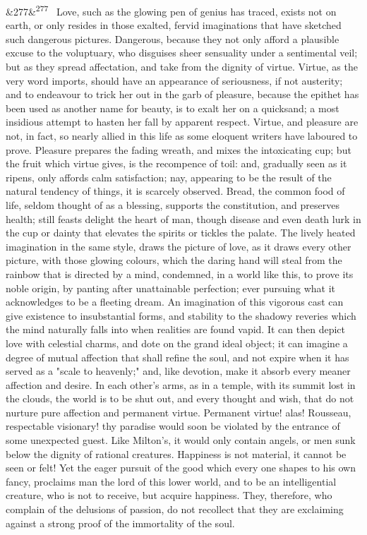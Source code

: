 \documentclass[12pt]{article}
\newcommand{\para}[1][]{\par\noindent\ifx&#1&\else\textsuperscript{\footnotesize #1}~\fi}
\begin{document}
\para[277] Love, such as the glowing pen of genius has traced, exists not on earth, or only resides in those exalted, fervid imaginations that have sketched such dangerous pictures. Dangerous, because they not only afford a plausible excuse to the voluptuary, who disguises sheer sensuality under a sentimental veil; but as they spread affectation, and take from the dignity of virtue. Virtue, as the very word imports, should have an appearance of seriousness, if not austerity; and to endeavour to trick her out in the garb of pleasure, because the epithet has been used as another name for beauty, is to exalt her on a quicksand; a most insidious attempt to hasten her fall by apparent respect. Virtue, and pleasure are not, in fact, so nearly allied in this life as some eloquent writers have laboured to prove. Pleasure prepares the fading wreath, and mixes the intoxicating cup; but the fruit which virtue gives, is the recompence of toil: and, gradually seen as it ripens, only affords calm satisfaction; nay, appearing to be the result of the natural tendency of things, it is scarcely observed. Bread, the common food of life, seldom thought of as a blessing, supports the constitution, and preserves health; still feasts delight the heart of man, though disease and even death lurk in the cup or dainty that elevates the spirits or tickles the palate. The lively heated imagination in the same style, draws the picture of love, as it draws every other picture, with those glowing colours, which the daring hand will steal from the rainbow that is directed by a mind, condemned, in a world like this, to prove its noble origin, by panting after unattainable perfection; ever pursuing what it acknowledges to be a fleeting dream. An imagination of this vigorous cast can give existence to insubstantial forms, and stability to the shadowy reveries which the mind naturally falls into when realities are found vapid. It can then depict love with celestial charms, and dote on the grand ideal object; it can imagine a degree of mutual affection that shall refine the soul, and not expire when it has served as a "scale to heavenly;" and, like devotion, make it absorb every meaner affection and desire. In each other's arms, as in a temple, with its summit lost in the clouds, the world is to be shut out, and every thought and wish, that do not nurture pure affection and permanent virtue. Permanent virtue! alas! Rousseau, respectable visionary! thy paradise would soon be violated by the entrance of some unexpected guest. Like Milton's, it would only contain angels, or men sunk below the dignity of rational creatures. Happiness is not material, it cannot be seen or felt! Yet the eager pursuit of the good which every one shapes to his own fancy, proclaims man the lord of this lower world, and to be an intelligential creature, who is not to receive, but acquire happiness. They, therefore, who complain of the delusions of passion, do not recollect that they are exclaiming against a strong proof of the immortality of the soul.
\end{document}
